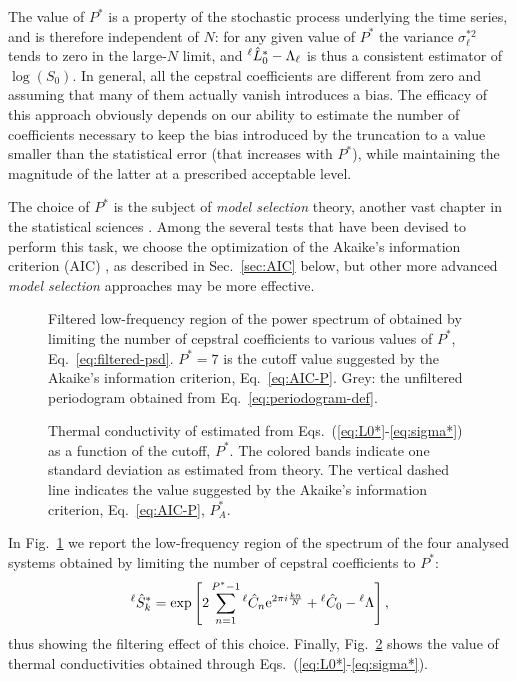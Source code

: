 The value of $P^{*}$ is a property of the stochastic process underlying the time series, and is therefore independent of $N$: for any given value of $P^{*}$ the variance $\sigma_{\ell}^{*2}$ tends to zero in the large-$N$ limit, and $^\ell\hat{L}^*_0-{\mathrm\Lambda}_{\ell}$ is thus a consistent estimator of $\log(S_{0})$. In general, all the cepstral coefficients are different from zero and assuming that many of them actually vanish introduces a bias. 
The efficacy of this approach obviously depends on our ability to estimate the number of coefficients necessary to keep the bias introduced by the truncation to a value smaller than the statistical error (that increases with $P^*$), while maintaining the magnitude of the latter at a prescribed acceptable level. 

The choice of $P^*$ is the subject of \emph{model selection} theory, another vast chapter in the statistical sciences \cite{Claeskens2008}. Among the several tests that have been devised to perform this task, we choose the optimization of the Akaike's information criterion (AIC) \cite{Claeskens2008,Akaike1974}, as described in Sec.~\ref{sec:AIC} below, but other more advanced \emph{model selection} approaches \citep{Claeskens2008} may be more effective.

\begin{figure}[!tb]
    \centering
    \caption{
    Filtered low-frequency region of the power spectrum of \LEnote{******} obtained by limiting the number of cepstral coefficients to various values of $P^*$, Eq.~\eqref{eq:filtered-psd}. $P^*=7$ is the cutoff value suggested by the Akaike's information criterion, Eq.~\eqref{eq:AIC-P}. Grey: the unfiltered periodogram obtained from Eq.~\eqref{eq:periodogram-def}.
    }  \label{fig:filtered-psds}
\end{figure}
\begin{figure}[!tb]
    \centering
    \caption{
    Thermal conductivity of \LEnote{******} estimated from Eqs.~(\ref{eq:L0*}-\ref{eq:sigma*}) as a function of the cutoff, $P^*$. The colored bands indicate one standard deviation as estimated from theory. The vertical dashed line indicates the value suggested by the Akaike's information criterion, Eq.~\eqref{eq:AIC-P}, $P_A^*$.
    }  \label{fig:kappa-convergence-Pstar}
\end{figure}

In Fig.~\ref{fig:filtered-psds} we report the low-frequency region of the spectrum of the four analysed systems obtained by limiting the number of cepstral coefficients to $P^*$:
\begin{equation}
    ^\ell\hat{S}_k^* = \exp\left[ 2\sum_{n=1}^{P^*-1} {}^\ell\hat{C}_n \mathrm{e}^{2\pi i \frac{k n}{N}} + {}^\ell\hat{C}_0 - {}^\ell\rLambda\right], \label{eq:filtered-psd}
\end{equation}
thus showing the filtering effect of this choice.
Finally, Fig.~\ref{fig:kappa-convergence-Pstar} shows the value of thermal conductivities obtained through Eqs.~(\ref{eq:L0*}-\ref{eq:sigma*}).


